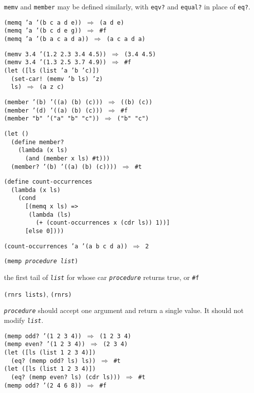\texttt{memv} and \texttt{member} may be defined similarly, with \texttt{eqv?} and \texttt{equal?}
in place of \texttt{eq?}.

\begin{alltt}
(memq 'a '(b c a d e)) \(\Rightarrow\) (a d e)
(memq 'a '(b c d e g)) \(\Rightarrow\) \#{}f
(memq 'a '(b a c a d a)) \(\Rightarrow\) (a c a d a)

(memv 3.4 '(1.2 2.3 3.4 4.5)) \(\Rightarrow\) (3.4 4.5)
(memv 3.4 '(1.3 2.5 3.7 4.9)) \(\Rightarrow\) \#{}f
(let ([ls (list 'a 'b 'c)])
  (set-car! (memv 'b ls) 'z)
  ls) \(\Rightarrow\) (a z c)

(member '(b) '((a) (b) (c))) \(\Rightarrow\) ((b) (c))
(member '(d) '((a) (b) (c))) \(\Rightarrow\) \#{}f
(member "b" '("a" "b" "c")) \(\Rightarrow\) ("b" "c")

(let ()
  (define member?
    (lambda (x ls)
      (and (member x ls) \#{}t)))
  (member? '(b) '((a) (b) (c)))) \(\Rightarrow\) \#{}t

(define count-occurrences
  (lambda (x ls)
    (cond
      [(memq x ls) =\textgreater{}
       (lambda (ls)
         (+ (count-occurrences x (cdr ls)) 1))]
      [else 0])))

(count-occurrences 'a '(a b c d a)) \(\Rightarrow\) 2
\end{alltt}

\begin{description}

\label{objects_s52}\item[procedure] \texttt{(memp \textit{procedure} \textit{list})}



\item[returns] the first tail of \texttt{\textit{list}} for whose car \texttt{\textit{procedure}} returns true, or \texttt{\#{}f}


\item[libraries] \texttt{(rnrs lists)}, \texttt{(rnrs)}
\end{description}

\texttt{\textit{procedure}} should accept one argument and return a single value.
It should not modify \texttt{\textit{list}}.

\begin{alltt}
(memp odd? '(1 2 3 4)) \(\Rightarrow\) (1 2 3 4)
(memp even? '(1 2 3 4)) \(\Rightarrow\) (2 3 4)
(let ([ls (list 1 2 3 4)])
  (eq? (memp odd? ls) ls)) \(\Rightarrow\) \#{}t
(let ([ls (list 1 2 3 4)])
  (eq? (memp even? ls) (cdr ls))) \(\Rightarrow\) \#{}t
(memp odd? '(2 4 6 8)) \(\Rightarrow\) \#{}f
\end{alltt}

